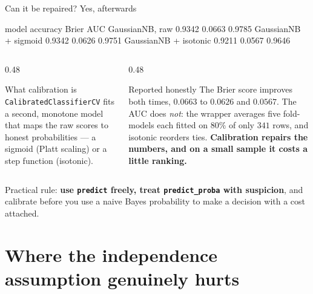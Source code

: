 \documentclass[aspectratio=169]{beamer}
\begin{document}
\begin{frame}[fragile,shrink=6]{Can it be repaired? Yes, afterwards}
\begin{outblk}
   model                               accuracy    Brier      AUC
   GaussianNB, raw                       0.9342   0.0663   0.9785
   GaussianNB + sigmoid                  0.9342   0.0626   0.9751
   GaussianNB + isotonic                 0.9211   0.0567   0.9646
\end{outblk}
\begin{columns}[T]
  \begin{column}{0.48\textwidth}
    \begin{block}{What calibration is}
      \footnotesize \texttt{CalibratedClassifierCV} fits a second, monotone
      model that maps the raw scores to honest probabilities --- a sigmoid
      (Platt scaling) or a step function (isotonic).
    \end{block}
  \end{column}
  \begin{column}{0.48\textwidth}
    \begin{alertblock}{Reported honestly}
      \footnotesize The Brier score improves both times, $0.0663$ to
      $0.0626$ and $0.0567$. The AUC does \emph{not}: the wrapper averages
      five fold-models each fitted on $80\%$ of only $341$ rows, and
      isotonic reorders ties. \textbf{Calibration repairs the numbers, and
      on a small sample it costs a little ranking.}
    \end{alertblock}
  \end{column}
\end{columns}
\begin{center}\small
  Practical rule: \textbf{use \texttt{predict} freely, treat
  \texttt{predict\_proba} with suspicion}, and calibrate before you use a
  naive Bayes probability to make a decision with a cost attached.
\end{center}
\end{frame}

\section[Where it hurts]{Where the independence assumption genuinely hurts}
\label{sec:hurts}
\end{document}
